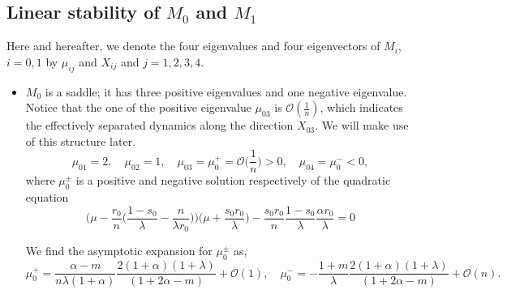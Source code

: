 \documentclass[a4paper,11pt]{article}
\def\BO{{\mathcal{O}}}
\begin{document}
\subsection{Linear stability of $M_0$ and $M_1$}
Here and hereafter, we denote the four eigenvalues and four eigenvectors of $M_i$, $i=0,1$  by $\mu_{ij}$ and $X_{ij}$ and $j=1,2,3,4$.
\begin{itemize}
 \item $M_0$ is a saddle; it has three positive eigenvalues and one negative eigenvalue. Notice that the one of the positive eigenvalue $\mu_{03}$ is $\mathcal{O}( \frac{1}{n})$, which indicates the effectively separated dynamics along the direction $X_{03}$. We will make use of this structure later.
 \begin{equation}
  \mu_{01} = 2, \quad \mu_{02}=1, \quad \mu_{03}=\mu_0^+=\BO\Big(\frac{1}{n}\Big)>0, \quad \mu_{04}=\mu_0^{-}<0, 
 \end{equation}
  where $\mu_0^\pm$ is a positive and negative solution respectively of the quadratic equation
 $$ \Big(\mu - \frac{r_0}{n}\Big(\frac{1-s_0}{\lambda}-\frac{n}{\lambda r_0}\Big)\Big)\Big(\mu + \frac{s_0r_0}{\lambda}\Big) - \frac{s_0r_0}{n} \frac{1-s_0}{\lambda}\frac{\alpha r_0}{\lambda} = 0$$
 
We find the asymptotic expansion for $\mu_0^\pm$ as,
$$\mu_0^+ = \frac{\alpha-m}{n\lambda(1+\alpha)}\frac{2(1+\alpha)(1+\lambda)}{(1+2\alpha-m)}+\BO(1), \quad\mu_0^- = -\frac{1+m}{\lambda}\frac{2(1+\alpha)(1+\lambda)}{(1+2\alpha-m)}  + \BO(n).$$


\end{itemize}
\end{document}

